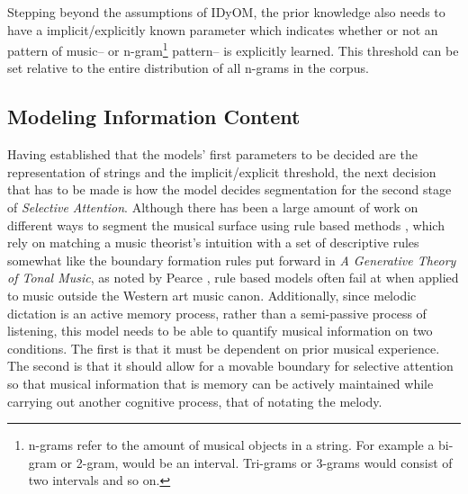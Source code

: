 \documentclass[]{book}
\let\rmarkdownfootnote\footnote%
\def\footnote{\protect\rmarkdownfootnote}
\theoremstyle{definition}
\theoremstyle{definition}
\theoremstyle{definition}
\theoremstyle{remark}
\begin{document}
Stepping beyond the assumptions of IDyOM, the prior knowledge also needs
to have a implicit/explicitly known parameter which indicates whether or
not an pattern of music-- or n-gram\footnote{n-grams refer to the amount
  of musical objects in a string. For example a bi-gram or 2-gram, would
  be an interval. Tri-grams or 3-grams would consist of two intervals
  and so on.} pattern-- is explicitly learned. This threshold can be set
relative to the entire distribution of all n-grams in the corpus.

\hypertarget{modeling-information-content}{%
\subsection{Modeling Information
Content}\label{modeling-information-content}}

Having established that the models' first parameters to be decided are
the representation of strings and the implicit/explicit threshold, the
next decision that has to be made is how the model decides segmentation
for the second stage of \emph{Selective Attention}. Although there has
been a large amount of work on different ways to segment the musical
surface using rule based methods
\citep{lerdahlGenerativeTheoryTonal1986, margulisModelMelodicExpectation2005, narmourAnalysisCognitionBasic1990, narmourAnalysisCognitionMelodic1992},
which rely on matching a music theorist's intuition with a set of
descriptive rules somewhat like the boundary formation rules put forward
in \emph{A Generative Theory of Tonal Music}, as noted by Pearce
\citep{pearceStatisticalLearningProbabilistic2018a}, rule based models
often fail at when applied to music outside the Western art music canon.
Additionally, since melodic dictation is an active memory process,
rather than a semi-passive process of listening, this model needs to be
able to quantify musical information on two conditions. The first is
that it must be dependent on prior musical experience. The second is
that it should allow for a movable boundary for selective attention so
that musical information that is memory can be actively maintained while
carrying out another cognitive process, that of notating the melody.
\end{document}

